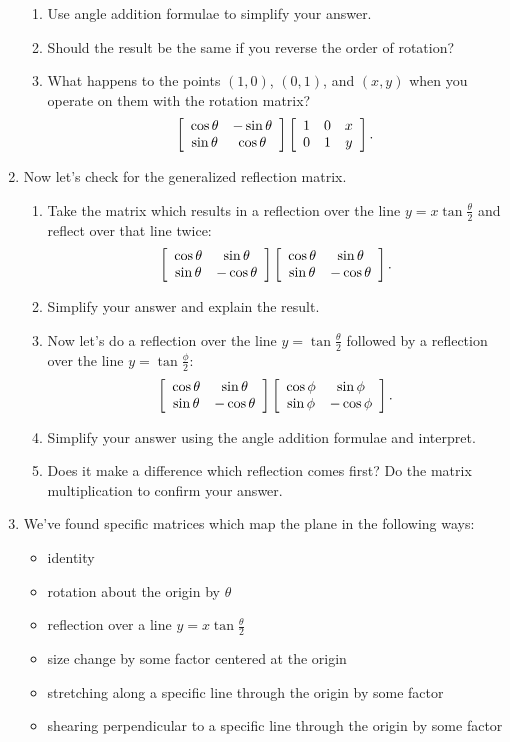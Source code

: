 \documentclass[../gatm.tex]{subfiles}
\begin{document}
\begin{enumerate}
\begin{enumerate}
\item Use angle addition formulae to simplify your answer.
\item Should the result be the same if you reverse the order of rotation?
\item What happens to the points $(1,0)$, $(0,1)$, and $(x,y)$ when you operate on them with the rotation matrix? $$\left[\begin{array}{cc} \cos \theta & -\sin \theta \\ \sin\theta & \cos\theta \end{array}\right]\left[\begin{array}{ccc} 1 & 0 & x \\ 0 & 1 & y \end{array}\right].$$
\end{enumerate}
\item Now let's check for the generalized reflection matrix.
\begin{enumerate}
\item Take the matrix which results in a reflection over the line $y=x\tan \frac{\theta}{2}$ and reflect over that line twice: $$\left[\begin{array}{cc} \cos\theta & \sin\theta \\ \sin\theta & -\cos\theta \end{array}\right]\left[\begin{array}{cc} \cos\theta & \sin\theta \\ \sin\theta & -\cos\theta \end{array}\right].$$
\item Simplify your answer and explain the result.
\item Now let's do a reflection over the line $y=\tan\frac{\theta}{2}$ followed by a reflection over the line $y=\tan\frac{\phi}{2}$:
$$\left[\begin{array}{cc} \cos\theta & \sin\theta \\ \sin\theta & -\cos\theta \end{array}\right]\left[\begin{array}{cc} \cos\phi & \sin\phi \\ \sin\phi & -\cos\phi \end{array}\right].$$
\item Simplify your answer using the angle addition formulae and interpret.
\item Does it make a difference which reflection comes first? Do the matrix multiplication to confirm your answer.
\end{enumerate}
\item We've found specific matrices which map the plane in the following ways:
\begin{itemize}
\item identity
\item rotation about the origin by $\theta$
\item reflection over a line $y=x \tan\frac{\theta}{2}$
\item size change by some factor centered at the origin
\item stretching along a specific line through the origin by some factor
\item shearing perpendicular to a specific line through the origin by some factor
\end{itemize}

\end{enumerate}
\end{document}
